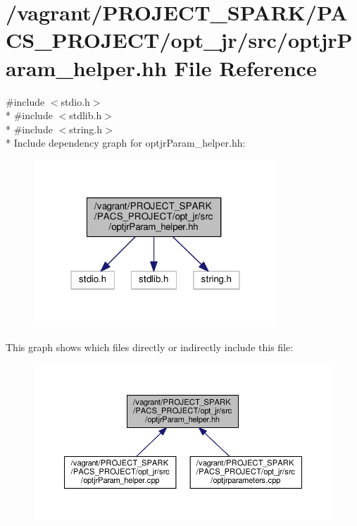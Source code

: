 \hypertarget{optjrParam__helper_8hh}{\section{/vagrant/\-P\-R\-O\-J\-E\-C\-T\-\_\-\-S\-P\-A\-R\-K/\-P\-A\-C\-S\-\_\-\-P\-R\-O\-J\-E\-C\-T/opt\-\_\-jr/src/optjr\-Param\-\_\-helper.hh File Reference}
\label{optjrParam__helper_8hh}
}
{\ttfamily \#include $<$stdio.\-h$>$}\\*
{\ttfamily \#include $<$stdlib.\-h$>$}\\*
{\ttfamily \#include $<$string.\-h$>$}\\*
Include dependency graph for optjr\-Param\-\_\-helper.\-hh\-:\nopagebreak
\begin{figure}[H]
\begin{center}
\leavevmode
\includegraphics[width=259pt]{optjrParam__helper_8hh__incl}
\end{center}
\end{figure}
This graph shows which files directly or indirectly include this file\-:\nopagebreak
\begin{figure}[H]
\begin{center}
\leavevmode
\includegraphics[width=350pt]{optjrParam__helper_8hh__dep__incl}
\end{center}
\end{figure}
